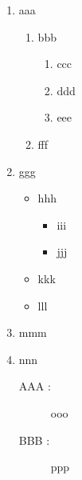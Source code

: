 \documentclass{scrartcl}
\begin{document}
\begin{enumerate}
    \item aaa
    \begin{enumerate}
        \item bbb
        \begin{enumerate}
            \item ccc
            \item ddd
            \item eee
        \end{enumerate}
        \item fff
    \end{enumerate}
    \item ggg
        \begin{itemize}
            \item hhh
            \begin{itemize}
                \item iii
                \item jjj
            \end{itemize}
            \item kkk
            \item lll
        \end{itemize}
    \item mmm
    \item nnn
        \begin{description}
            \item[AAA :] ooo
            \item[BBB :] ppp
        \end{description}

\end{enumerate}
\end{document}
